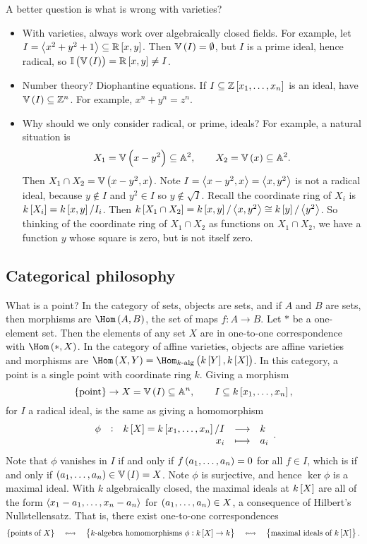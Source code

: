 A better question is what is wrong with varieties?
\begin{itemize}
\item With varieties, always work over algebraically closed fields. For example, let $ I = \abr{x^2 + y^2 + 1} \subseteq \RR\sbr{x, y} $. Then $ \VV\br{I} = \emptyset $, but $ I $ is a prime ideal, hence radical, so $ \II\br{\VV\br{I}} = \RR\sbr{x, y} \ne I $.
\item Number theory? Diophantine equations. If $ I \subseteq \ZZ\sbr{x_1, \dots, x_n} $ is an ideal, have $ \VV\br{I} \subseteq \ZZ^n $. For example, $ x^n + y^n = z^n $.
\item Why should we only consider radical, or prime, ideals? For example, a natural situation is
$$ X_1 = \VV\br{x - y^2} \subseteq \AA^2, \qquad X_2 = \VV\br{x} \subseteq \AA^2. $$
Then $ X_1 \cap X_2 = \VV\br{x - y^2, x} $. Note $ I = \left\langle x - y^2, x \right\rangle = \left\langle x, y^2 \right\rangle $ is not a radical ideal, because $ y \notin I $ and $ y^2 \in I $ so $ y \not\in \sqrt{I} $. Recall the coordinate ring of $ X_i $ is $ k\sbr{X_i} = k\sbr{x, y} / I_i $. Then $ k\sbr{X_1 \cap X_2} = k\sbr{x, y} / \abr{x, y^2} \cong k\sbr{y} / \abr{y^2} $. So thinking of the coordinate ring of $ X_1 \cap X_2 $ as functions on $ X_1 \cap X_2 $, we have a function $ y $ whose square is zero, but is not itself zero.
\end{itemize}

\pagebreak

\subsection{Categorical philosophy}

What is a point? In the category of sets, objects are sets, and if $ A $ and $ B $ are sets, then morphisms are $ \Hom\br{A, B} $, the set of maps $ f : A \to B $. Let $ * $ be a one-element set. Then the elements of any set $ X $ are in one-to-one correspondence with $ \Hom\br{*, X} $. In the category of affine varieties, objects are affine varieties and morphisms are $ \Hom\br{X, Y} = \Hom_{\text{$ k $-alg}}\br{k\sbr{Y}, k\sbr{X}} $. In this category, a point is a single point with coordinate ring $ k $. Giving a morphism
$$ \cbr{\text{point}} \to X = \VV\br{I} \subseteq \AA^n, \qquad I \subseteq k\sbr{x_1, \dots, x_n}, $$
for $ I $ a radical ideal, is the same as giving a homomorphism
$$ \function[\phi]{k\sbr{X} = k\sbr{x_1, \dots, x_n} / I}{k}{x_i}{a_i}. $$
Note that $ \phi $ vanishes in $ I $ if and only if $ f\br{a_1, \dots, a_n} = 0 $ for all $ f \in I $, which is if and only if $ \br{a_1, \dots, a_n} \in \VV\br{I} = X $. Note $ \phi $ is surjective, and hence $ \ker \phi $ is a maximal ideal. With $ k $ algebraically closed, the maximal ideals at $ k\sbr{X} $ are all of the form $ \left\langle x_1 - a_1, \dots, x_n - a_n \right\rangle $ for $ \br{a_1, \dots, a_n} \in X $, a consequence of Hilbert's Nullstellensatz. That is, there exist one-to-one correspondences
$$ \cbr{\text{points of} \ X} \quad \leftrightsquigarrow \quad \cbr{\text{$ k $-algebra homomorphisms} \ \phi : k\sbr{X} \to k} \quad \leftrightsquigarrow \quad \cbr{\text{maximal ideals of} \ k\sbr{X}}. $$

